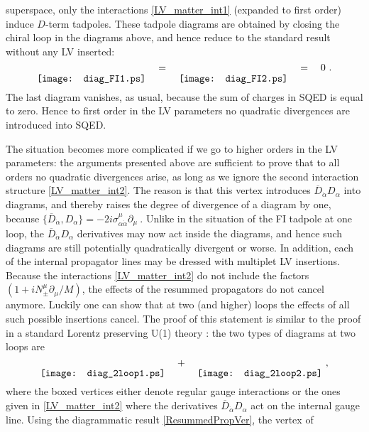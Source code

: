 \documentclass[12pt]{revtex4}
\begin{document}
superspace, only the interactions \eqref{LV_matter_int1} (expanded to
first order) induce $D$-term tadpoles. These tadpole diagrams are
obtained by closing the chiral loop in the diagrams above, and hence
reduce to the standard result without any LV inserted: 
\begin{equation}
\raisebox{-2.5ex}{\texttt{[image: diag\_FI1.ps]}}
\quad = \quad 
\raisebox{-2.5ex}{\texttt{[image: diag\_FI2.ps]}}
\quad = \quad 0~. 
\end{equation}
The last diagram vanishes, as usual, because the sum of charges in SQED is equal
to zero. Hence to first order in the LV parameters no quadratic
divergences are introduced into SQED. 


The situation becomes more complicated if we go to higher orders in 
the LV parameters: the arguments presented above are sufficient to
prove that to all orders no quadratic divergences arise, as long as we
ignore the second interaction structure \eqref{LV_matter_int2}. The
reason is that this vertex introduces $\overline{D}_{\dot\alpha}
D_\alpha$ into diagrams, and thereby raises 
the degree of divergence of a diagram by one, because 
\(
\{\overline{D}_{\dot\alpha}, D_\alpha\} = 
-2 i \sigma_{\alpha\dot\alpha}^\mu \partial_\mu~.
\) 
Unlike in the situation of the FI tadpole at one loop, the
$\overline{D}_{\dot\alpha} D_\alpha$ derivatives may now act inside
the diagrams, and hence such diagrams 
are still potentially quadratically divergent or worse. In addition, 
each of the internal propagator lines may be dressed with multiplet LV
insertions. Because the interactions \eqref{LV_matter_int2} do
not include the factors $(1+i N_\pm^\mu \partial_\mu/M)$, the effects
of the resummed propagators do not cancel anymore. Luckily one 
can show that at two (and higher) loops the effects of all such
possible insertions cancel. The proof of this statement is similar to
the proof in a standard Lorentz preserving U(1) theory
\cite{Fischler:1981zk}: the two types of diagrams at two loops are 
\begin{equation}
\raisebox{-2.5ex}{\texttt{[image: diag\_2loop1.ps]}}
\quad + \quad 
\raisebox{-2.5ex}{\texttt{[image: diag\_2loop2.ps]}}
~,
\end{equation} 
where the boxed vertices either denote regular gauge interactions or
the ones given in \eqref{LV_matter_int2} where the derivatives
$\overline{D}_{\dot\alpha} D_\alpha$ act on the internal gauge line. 
Using the diagrammatic result \eqref{ResummedPropVer}, the vertex of 
\end{document}

